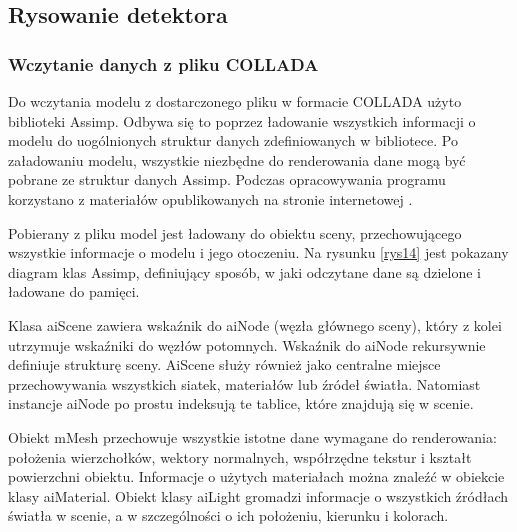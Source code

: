 \subsection{Rysowanie detektora}
\subsubsection{Wczytanie danych z pliku COLLADA}
Do wczytania modelu z dostarczonego pliku w formacie COLLADA użyto biblioteki Assimp. Odbywa się to poprzez ładowanie wszystkich informacji o modelu do uogólnionych struktur danych zdefiniowanych w bibliotece. Po załadowaniu modelu, wszystkie niezbędne do renderowania dane mogą być pobrane ze struktur danych Assimp. Podczas opracowywania programu korzystano z materiałów opublikowanych na stronie internetowej \cite{learnopengl}. 

Pobierany z pliku model jest ładowany do obiektu sceny, przechowującego wszystkie informacje o modelu i jego otoczeniu. Na rysunku \ref{rys14} jest pokazany diagram klas Assimp, definiujący sposób, w jaki odczytane dane są dzielone i ładowane do pamięci.

Klasa aiScene zawiera wskaźnik do aiNode (węzła głównego sceny), który z kolei utrzymuje wskaźniki do węzłów potomnych. Wskaźnik do aiNode rekursywnie definiuje strukturę sceny. AiScene służy również jako centralne miejsce przechowywania wszystkich siatek, materiałów lub źródeł światła. Natomiast instancje aiNode po prostu indeksują te tablice, które znajdują się w scenie.

Obiekt mMesh przechowuje wszystkie istotne dane wymagane do renderowania: położenia wierzchołków, wektory normalnych, współrzędne tekstur i kształt powierzchni obiektu. Informacje o użytych materiałach można znaleźć w obiekcie klasy aiMaterial. Obiekt klasy aiLight gromadzi informacje o wszystkich źródłach światła w scenie, a w szczególności o ich położeniu, kierunku i kolorach. 

